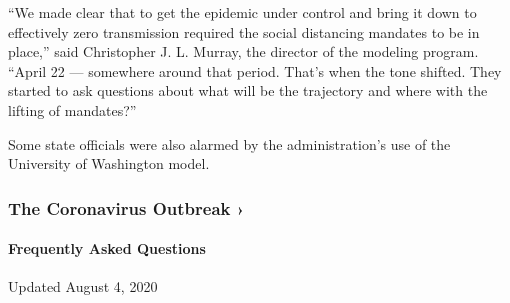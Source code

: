 ``We made clear that to get the epidemic under control and bring it down
to effectively zero transmission required the social distancing mandates
to be in place,'' said Christopher J. L. Murray, the director of the
modeling program. ``April 22 --- somewhere around that period. That's
when the tone shifted. They started to ask questions about what will be
the trajectory and where with the lifting of mandates?''

Some state officials were also alarmed by the administration's use of
the University of Washington model.

\href{https://www.nytimes3xbfgragh.onion/news-event/coronavirus?action=click\&pgtype=Article\&state=default\&region=MAIN_CONTENT_3\&context=storylines_faq}{}

\hypertarget{the-coronavirus-outbreak-}{%
\subsubsection{The Coronavirus Outbreak
›}\label{the-coronavirus-outbreak-}}

\hypertarget{frequently-asked-questions}{%
\paragraph{Frequently Asked
Questions}\label{frequently-asked-questions}}

Updated August 4, 2020

